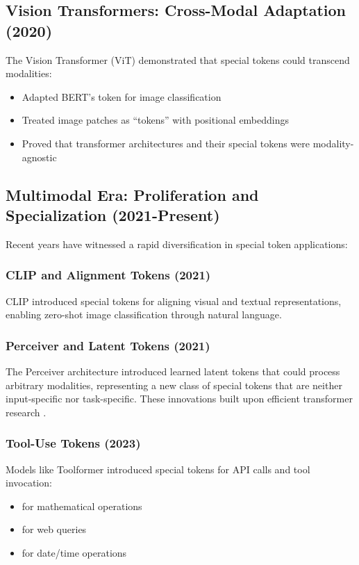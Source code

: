 \subsection{Vision Transformers: Cross-Modal Adaptation (2020)}

The Vision Transformer (ViT) \citep{dosovitskiy2020image} demonstrated that special tokens could transcend modalities:

\begin{itemize}
\item Adapted BERT's \cls{} token for image classification
\item Treated image patches as ``tokens'' with positional embeddings
\item Proved that transformer architectures and their special tokens were modality-agnostic
\end{itemize}

\subsection{Multimodal Era: Proliferation and Specialization (2021-Present)}

Recent years have witnessed a rapid diversification in special token applications:

\subsubsection{CLIP and Alignment Tokens (2021)}
CLIP \citep{radford2021learning} introduced special tokens for aligning visual and textual representations, enabling zero-shot image classification through natural language.

\subsubsection{Perceiver and Latent Tokens (2021)}
The Perceiver architecture introduced learned latent tokens that could process arbitrary modalities, representing a new class of special tokens that are neither input-specific nor task-specific. These innovations built upon efficient transformer research \citep{tay2022efficient}.

\subsubsection{Tool-Use Tokens (2023)}
Models like Toolformer \citep{schick2023toolformer} introduced special tokens for API calls and tool invocation:
\begin{itemize}
\item {} for mathematical operations
\item {} for web queries
\item {} for date/time operations
\end{itemize}

